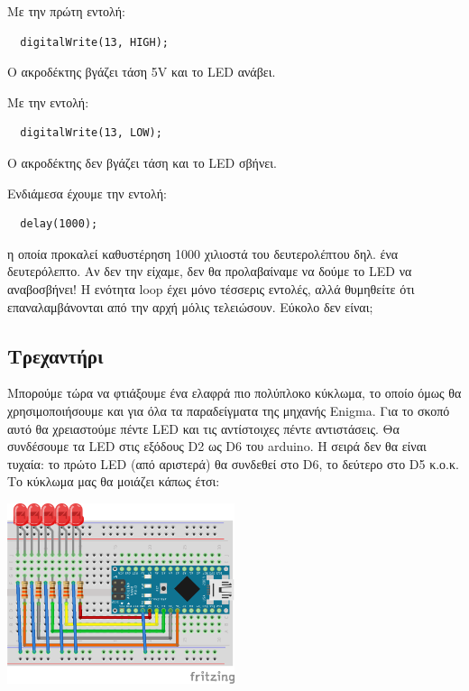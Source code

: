 \documentclass[a4paper,twoside,12pt]{article}
\begin{document}
Με την πρώτη εντολή:

\begin{verbatim}
  digitalWrite(13, HIGH);   
\end{verbatim}

Ο ακροδέκτης βγάζει τάση 5V και το LED ανάβει.

Με την εντολή:

\begin{verbatim}
  digitalWrite(13, LOW);    
\end{verbatim}

O ακροδέκτης δεν βγάζει τάση και το LED σβήνει.

Ενδιάμεσα έχουμε την εντολή:

\begin{verbatim}
  delay(1000);
\end{verbatim}

η οποία προκαλεί καθυστέρηση 1000 χιλιοστά του δευτερολέπτου δηλ. ένα δευτερόλεπτο. Αν δεν την είχαμε, δεν θα προλαβαίναμε να δούμε το LED να αναβοσβήνει!  Η ενότητα loop έχει μόνο τέσσερις εντολές, αλλά θυμηθείτε ότι επαναλαμβάνονται από την αρχή μόλις τελειώσουν. Εύκολο δεν είναι;

\subsection{Τρεχαντήρι}

Μπορούμε τώρα να φτιάξουμε ένα ελαφρά πιο πολύπλοκο κύκλωμα, το οποίο όμως θα χρησιμοποιήσουμε και για όλα τα παραδείγματα της μηχανής Enigma. Για το σκοπό αυτό θα χρειαστούμε πέντε LED και τις αντίστοιχες πέντε αντιστάσεις.  Θα συνδέσουμε τα LED στις εξόδους D2 ως D6 του arduino. Η σειρά δεν θα είναι τυχαία: το πρώτο LED (από αριστερά) θα συνδεθεί στο D6, το δεύτερο στο D5 κ.ο.κ.  Το κύκλωμα μας θα μοιάζει κάπως έτσι:

\begin{center}
  \includegraphics[width=0.5\textwidth]{images/main/running-lights}
\end{center}
\end{document}
